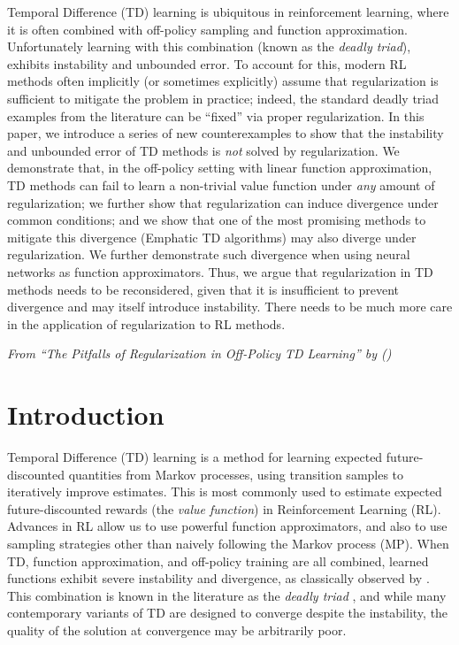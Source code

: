 Temporal Difference (TD) learning is ubiquitous in reinforcement learning, where it is often combined with off-policy sampling and function approximation.  Unfortunately learning with this combination (known as the \emph{deadly triad}), exhibits instability and unbounded error.  To account for this, modern RL methods often implicitly (or sometimes explicitly) assume that regularization is sufficient to mitigate the problem in practice; indeed, the standard deadly triad examples from the literature can be ``fixed'' via proper regularization. In this paper, we introduce a series of new counterexamples to show that the instability and unbounded error of TD methods is \emph{not} solved by regularization. We demonstrate that, in the off-policy setting with linear function approximation, TD methods can fail to learn a non-trivial value function under \emph{any} amount of regularization; we further show that regularization can induce divergence under common conditions; and we show that one of the most promising methods to mitigate this divergence (Emphatic TD algorithms) may also diverge under regularization. We further demonstrate such divergence when using neural networks as function approximators.  Thus, we argue that regularization in TD methods needs to be reconsidered, given that it is insufficient to prevent divergence and may itself introduce instability. There needs to be much more care in the application of regularization to RL methods.

\emph{From ``The Pitfalls of Regularization in Off-Policy TD Learning'' by \citeauthor{manek2022pitfalls} (\citeyear{manek2022pitfalls})}


\section{Introduction}
Temporal Difference (TD) learning is a method for learning expected future-discounted quantities from Markov processes, using transition samples to iteratively improve estimates. This is most commonly used to estimate expected future-discounted rewards (the \emph{value function}) in Reinforcement Learning (RL). Advances in RL allow us to use powerful function approximators, and also to use sampling strategies other than naively following the Markov process (MP). When TD, function approximation, and off-policy training are all combined, learned functions exhibit severe instability and divergence, as classically observed by \citet{baird1993counterexample,tsitsiklis1996analysis}. This combination is known in the literature as the \emph{deadly triad} \cite[pg.~264]{sutton2020reinforcement}, and while many contemporary variants of TD are designed to converge despite the instability, the quality of the solution at convergence may be arbitrarily poor.

